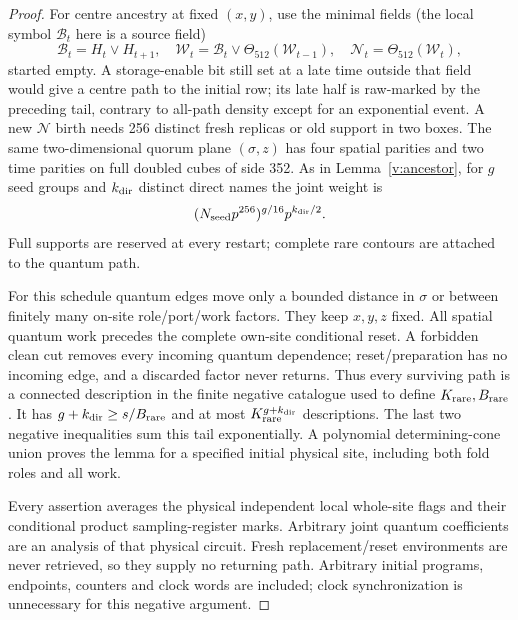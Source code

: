 \begin{proof}
For centre ancestry at fixed \((x,y)\), use the minimal fields
(the local symbol \(\mathcal B_t\) here is a source field)
\[
 \mathcal B_t=H_t\lor H_{t+1},\quad
 \mathcal W_t=\mathcal B_t\lor\Theta_{512}(\mathcal W_{t-1}),\quad
 \mathcal N_t=\Theta_{512}(\mathcal W_t),
\]
started empty. A storage-enable bit still set at a late time outside that field would give a centre
path to the initial row; its late half is raw-marked by the preceding
tail, contrary to all-path density except for an exponential event.
A new \(\mathcal N\) birth needs 256 distinct fresh replicas or old
support in two boxes. The same two-dimensional quorum plane
\((\sigma,z)\) has four spatial parities and two time parities on
full doubled cubes of side 352. As in Lemma~\ref{v:ancestor}, for
\(g\) seed groups and \(k_{\rm dir}\) distinct direct names the joint weight is
\[
 (N_{\rm seed}p^{256})^{g/16}p^{k_{\rm dir}/2}.
\]
Full supports are reserved at every restart; complete rare contours
are attached to the quantum path.

For this schedule quantum edges move only a bounded distance in
\(\sigma\) or between finitely many on-site role/port/work factors.
They keep \(x,y,z\) fixed. All spatial quantum work precedes the
complete own-site conditional reset. A forbidden clean cut removes every
incoming quantum dependence; reset/preparation has no incoming edge,
and a discarded factor never returns. Thus every surviving path is a
connected description in the finite negative catalogue used to define
\(K_{\rm rare},B_{\rm rare}\). It has
\(g+k_{\rm dir}\ge s/B_{\rm rare}\) and at most
\(K_{\rm rare}^{g+k_{\rm dir}}\) descriptions. The last two negative inequalities
sum this tail exponentially. A polynomial determining-cone union proves
the lemma for a specified initial physical site, including both fold
roles and all work.

Every assertion averages the physical independent local whole-site
flags and their conditional product sampling-register marks. Arbitrary joint
quantum coefficients are an analysis of that physical circuit. Fresh
replacement/reset environments are never retrieved, so they supply
no returning path. Arbitrary initial programs, endpoints, counters and
clock words are included; clock synchronization is unnecessary
for this negative argument.
\end{proof}


